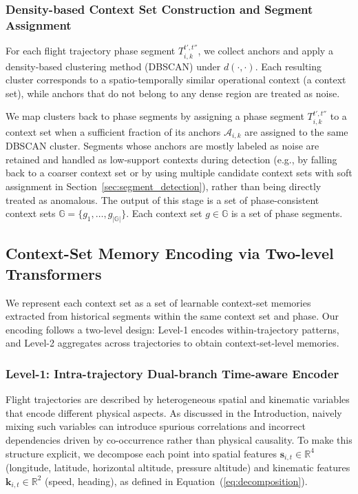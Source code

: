 \documentclass[iicol,pdflatex,sn-basic,Numbered]{sn-jnl}%
\theoremstyle{thmstyleone}%
\theoremstyle{thmstyletwo}%
\theoremstyle{thmstylethree}%
\begin{document}
\subsubsection{Density-based Context Set Construction and Segment Assignment}

For each flight trajectory phase segment $T^{t',t''}_{i,k}$, we collect anchors and apply a density-based clustering method (DBSCAN) under $d(\cdot,\cdot)$.
Each resulting cluster corresponds to a spatio-temporally similar operational context (a context set), while anchors that do not belong to any dense region are treated as noise.

We map clusters back to phase segments by assigning a phase segment $T^{t',t''}_{i,k}$ to a context set when a sufficient fraction of its anchors $\mathcal{A}_{i,k}$ are assigned to the same DBSCAN cluster.
Segments whose anchors are mostly labeled as noise are retained and handled as low-support contexts during detection (e.g., by falling back to a coarser context set or by using multiple candidate context sets with soft assignment in Section~\ref{sec:segment_detection}), rather than being directly treated as anomalous. The output of this stage is a set of phase-consistent context sets $\mathbb{G}=\{g_1,\ldots,g_{|\mathbb{G}|}\}$.
Each context set $g\in\mathbb{G}$ is a set of phase segments.

\subsection{Context-Set Memory Encoding via Two-level Transformers}
\label{sec:group_memory_encoding}

We represent each context set as a set of learnable context-set memories extracted from historical segments within the same context set and phase.
Our encoding follows a two-level design: Level-1 encodes within-trajectory patterns, and Level-2 aggregates across trajectories to obtain context-set-level memories.

\subsubsection{Level-1: Intra-trajectory Dual-branch Time-aware Encoder}

Flight trajectories are described by heterogeneous spatial and kinematic variables that encode different physical aspects. As discussed in the Introduction, naively mixing such variables can introduce spurious correlations and incorrect dependencies driven by co-occurrence rather than physical causality.
To make this structure explicit, we decompose each point into spatial features $\mathbf{s}_{i,t} \in \mathbb{R}^4$ (longitude, latitude, horizontal altitude, pressure altitude) and kinematic features $\mathbf{k}_{i,t} \in \mathbb{R}^2$ (speed, heading), as defined in Equation~(\ref{eq:decomposition}).
\end{document}
